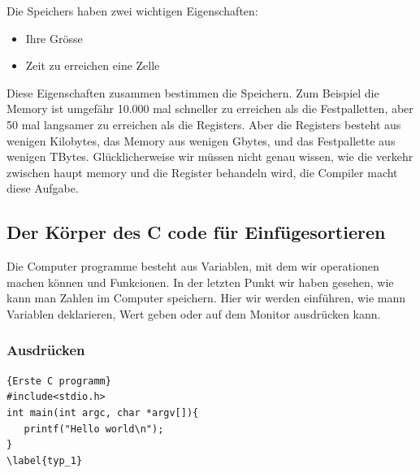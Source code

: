 \documentclass{article}[12pt]
\begin{document}
Die Speichers haben zwei wichtigen Eigenschaften: 
\begin{itemize}
\item Ihre Grösse 
\item Zeit zu erreichen eine Zelle
\end{itemize}
Diese Eigenschaften zusammen bestimmen die Speichern. Zum Beispiel die Memory ist umgefähr 10.000 mal
schneller zu erreichen als die  Festpalletten, aber 50 mal langsamer zu erreichen als die Registers. 
Aber die Registers besteht aus wenigen Kilobytes, das Memory aus wenigen Gbytes, und das Festpallette
aus wenigen TBytes. Glücklicherweise wir müssen nicht genau wissen, wie die verkehr zwischen haupt memory
und die Register behandeln wird, die Compiler macht diese Aufgabe. 

\subsection{Der Körper des C code für Einfügesortieren}
Die Computer programme besteht aus Variablen, mit dem wir operationen machen können und Funkcionen. In der letzten Punkt
wir haben gesehen, wie kann man Zahlen im Computer speichern. Hier wir werden einführen, wie mann Variablen
deklarieren, Wert geben oder auf dem Monitor ausdrücken kann.

\subsubsection{Ausdrücken}
\begin{lstlisting}{Erste C programm}
#include<stdio.h>
int main(int argc, char *argv[]){
   printf("Hello world\n");
}
\label{typ_1}
\end{lstlisting}
\end{document}

